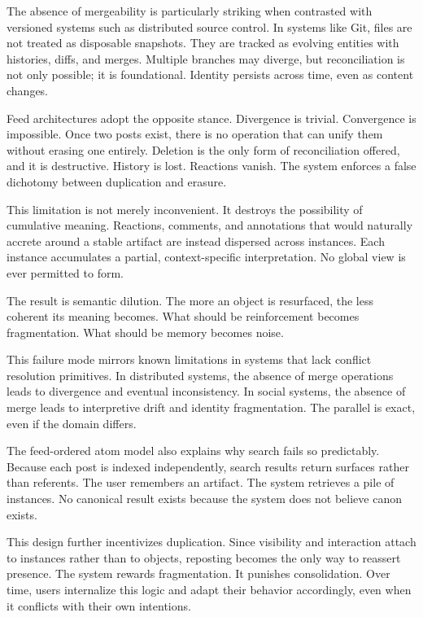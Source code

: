 \documentclass[11pt,oneside]{article}
\begin{document}
The absence of mergeability is particularly striking when contrasted with versioned systems such as distributed source control. In systems like Git, files are not treated as disposable snapshots. They are tracked as evolving entities with histories, diffs, and merges. Multiple branches may diverge, but reconciliation is not only possible; it is foundational. Identity persists across time, even as content changes.

Feed architectures adopt the opposite stance. Divergence is trivial. Convergence is impossible. Once two posts exist, there is no operation that can unify them without erasing one entirely. Deletion is the only form of reconciliation offered, and it is destructive. History is lost. Reactions vanish. The system enforces a false dichotomy between duplication and erasure.

This limitation is not merely inconvenient. It destroys the possibility of cumulative meaning. Reactions, comments, and annotations that would naturally accrete around a stable artifact are instead dispersed across instances. Each instance accumulates a partial, context-specific interpretation. No global view is ever permitted to form.

The result is semantic dilution. The more an object is resurfaced, the less coherent its meaning becomes. What should be reinforcement becomes fragmentation. What should be memory becomes noise.

This failure mode mirrors known limitations in systems that lack conflict resolution primitives. In distributed systems, the absence of merge operations leads to divergence and eventual inconsistency. In social systems, the absence of merge leads to interpretive drift and identity fragmentation. The parallel is exact, even if the domain differs.

The feed-ordered atom model also explains why search fails so predictably. Because each post is indexed independently, search results return surfaces rather than referents. The user remembers an artifact. The system retrieves a pile of instances. No canonical result exists because the system does not believe canon exists.

This design further incentivizes duplication. Since visibility and interaction attach to instances rather than to objects, reposting becomes the only way to reassert presence. The system rewards fragmentation. It punishes consolidation. Over time, users internalize this logic and adapt their behavior accordingly, even when it conflicts with their own intentions.
\end{document}
